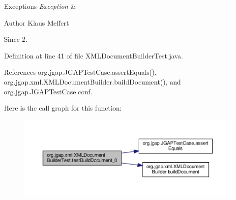 \begin{DoxyExceptions}{Exceptions}
{\em Exception} & \\
\hline
\end{DoxyExceptions}
\begin{DoxyAuthor}{Author}
Klaus Meffert 
\end{DoxyAuthor}
\begin{DoxySince}{Since}
2. 
\end{DoxySince}


Definition at line 41 of file X\-M\-L\-Document\-Builder\-Test.\-java.



References org.\-jgap.\-J\-G\-A\-P\-Test\-Case.\-assert\-Equals(), org.\-jgap.\-xml.\-X\-M\-L\-Document\-Builder.\-build\-Document(), and org.\-jgap.\-J\-G\-A\-P\-Test\-Case.\-conf.



Here is the call graph for this function\-:
\nopagebreak
\begin{figure}[H]
\begin{center}
\leavevmode
\includegraphics[width=350pt]{classorg_1_1jgap_1_1xml_1_1_x_m_l_document_builder_test_abc69bdf89f9427e385c5c8aa7c73fe18_cgraph}
\end{center}
\end{figure}



